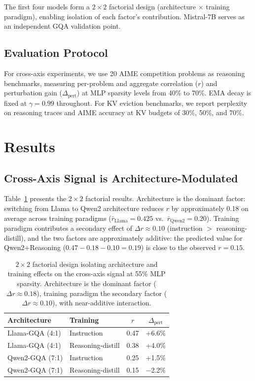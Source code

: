 \documentclass[11pt,a4paper]{article}
\begin{document}
The first four models form a $2 \times 2$ factorial design (architecture $\times$ training paradigm), enabling isolation of each factor's contribution.
Mistral-7B serves as an independent GQA validation point.

\subsection{Evaluation Protocol}

For cross-axis experiments, we use 20 AIME competition problems as reasoning benchmarks, measuring per-problem and aggregate correlation ($r$) and perturbation gain ($\Delta_\text{pert}$) at MLP sparsity levels from 40\% to 70\%.
EMA decay is fixed at $\gamma{=}0.99$ throughout.
For KV eviction benchmarks, we report perplexity on reasoning traces and AIME accuracy at KV budgets of 30\%, 50\%, and 70\%.

\section{Results}
\label{sec:results}

\subsection{Cross-Axis Signal is Architecture-Modulated}

Table~\ref{tab:confound} presents the $2\times 2$ factorial results.
Architecture is the dominant factor: switching from Llama to Qwen2 architecture reduces $r$ by approximately 0.18 on average across training paradigms ($\bar{r}_{\text{Llama}}{=}0.425$ vs.\ $\bar{r}_{\text{Qwen2}}{=}0.20$).
Training paradigm contributes a secondary effect of $\Delta r{\approx}0.10$ (instruction $>$ reasoning-distill), and the two factors are approximately additive: the predicted value for Qwen2+Reasoning ($0.47 - 0.18 - 0.10 = 0.19$) is close to the observed $r{=}0.15$.

\begin{table}[t]
\centering
\small
\begin{tabular}{llcc}
\toprule
\textbf{Architecture} & \textbf{Training} & \textbf{$r$} & \textbf{$\Delta_\text{pert}$} \\
\midrule
Llama-GQA (4:1) & Instruction      & 0.47 & +6.6\% \\
Llama-GQA (4:1) & Reasoning-distill & 0.38 & +4.0\% \\
\midrule
Qwen2-GQA (7:1) & Instruction      & 0.25 & +1.5\% \\
Qwen2-GQA (7:1) & Reasoning-distill & 0.15 & $-$2.2\% \\
\bottomrule
\end{tabular}
\caption{$2\times 2$ factorial design isolating architecture and training effects on the cross-axis signal at 55\% MLP sparsity. Architecture is the dominant factor ($\Delta r{\approx}0.18$), training paradigm the secondary factor ($\Delta r{\approx}0.10$), with near-additive interaction.}
\label{tab:confound}
\end{table}
\end{document}
